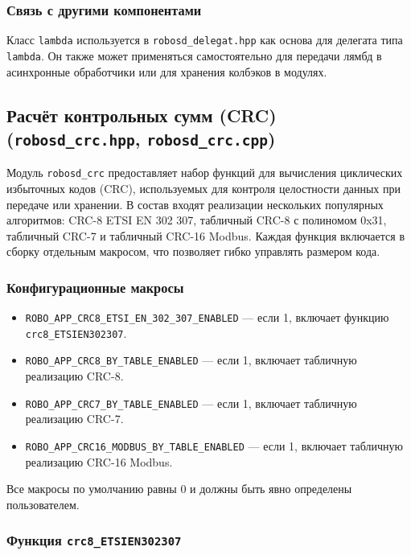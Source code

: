 \documentclass[a4paper,12pt]{article}
\begin{document}
\subsubsection{Связь с другими компонентами}

Класс \texttt{lambda} используется в \texttt{robosd\_delegat.hpp} как основа для делегата типа \texttt{lambda}. Он также может применяться самостоятельно для передачи лямбд в асинхронные обработчики или для хранения колбэков в модулях.

\subsection{Расчёт контрольных сумм (CRC) (\texttt{robosd\_crc.hpp}, \texttt{robosd\_crc.cpp})}

Модуль \texttt{robosd\_crc} предоставляет набор функций для вычисления циклических избыточных кодов (CRC), используемых для контроля целостности данных при передаче или хранении. В состав входят реализации нескольких популярных алгоритмов: CRC-8 ETSI EN 302 307, табличный CRC-8 с полиномом 0x31, табличный CRC-7 и табличный CRC-16 Modbus. Каждая функция включается в сборку отдельным макросом, что позволяет гибко управлять размером кода.

\subsubsection{Конфигурационные макросы}

\begin{itemize}
    \item \texttt{ROBO\_APP\_CRC8\_ETSI\_EN\_302\_307\_ENABLED} — если 1, включает функцию \texttt{crc8\_ETSIEN302307}.
    \item \texttt{ROBO\_APP\_CRC8\_BY\_TABLE\_ENABLED} — если 1, включает табличную реализацию CRC-8.
    \item \texttt{ROBO\_APP\_CRC7\_BY\_TABLE\_ENABLED} — если 1, включает табличную реализацию CRC-7.
    \item \texttt{ROBO\_APP\_CRC16\_MODBUS\_BY\_TABLE\_ENABLED} — если 1, включает табличную реализацию CRC-16 Modbus.
\end{itemize}

Все макросы по умолчанию равны 0 и должны быть явно определены пользователем.

\subsubsection{Функция \texttt{crc8\_ETSIEN302307}}
\end{document}
